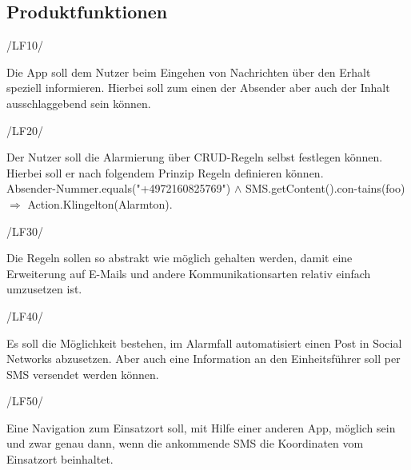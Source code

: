 \subsection{Produktfunktionen}
\begin{minipage}{3cm}
/LF10/
\end{minipage}
\begin{minipage}{13cm}
Die App soll dem Nutzer beim Eingehen von Nachrichten \"uber den Erhalt speziell informieren. Hierbei soll zum einen der Absender aber auch der Inhalt ausschlaggebend sein k\"onnen.\\
\end{minipage}
\begin{minipage}{3cm}
/LF20/
\end{minipage}
\begin{minipage}{13cm}
Der Nutzer soll die Alarmierung \"uber CRUD-Regeln selbst festlegen k\"onnen. Hierbei soll er nach folgendem Prinzip Regeln definieren k\"onnen.\\
Absender-Nummer.equals("+4972160825769") $\wedge$ SMS.getContent().con-tains(foo)
$\Rightarrow$ Action.Klingelton(Alarmton).\\
\end{minipage}
\begin{minipage}{3cm}
/LF30/
\end{minipage}
\begin{minipage}{13cm}
Die Regeln sollen so abstrakt wie m\"oglich gehalten werden, damit eine Erweiterung auf E-Mails und andere Kommunikationsarten relativ einfach umzusetzen ist.\\
\end{minipage}
\begin{minipage}{3cm}
/LF40/
\end{minipage}
\begin{minipage}{13cm}
Es soll die M\"oglichkeit bestehen, im Alarmfall automatisiert einen Post in Social Networks abzusetzen. Aber auch eine Information an den Einheitsf\"uhrer soll per SMS versendet werden k\"onnen.\\
\end{minipage}
\begin{minipage}{3cm}
/LF50/
\end{minipage}
\begin{minipage}{13cm}
Eine Navigation zum Einsatzort soll, mit Hilfe einer anderen App, m\"oglich sein und zwar genau dann, wenn die ankommende SMS die Koordinaten vom Einsatzort beinhaltet.\\
\end{minipage}
